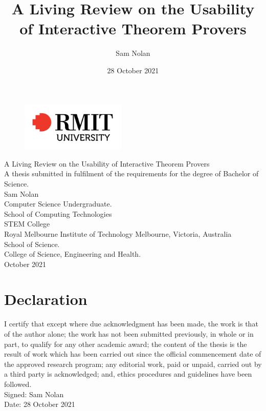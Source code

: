 \documentclass[
]{article}
\title{A Living Review on the Usability of Interactive Theorem Provers}
\author{Sam Nolan}
\date{28 October 2021}
\begin{document}
\begin{titlepage}
\begin{figure}[t!]
\centering
\includegraphics[width=5cm]{Images/rmit-logo.png}
\end{figure}


\vspace*{2cm}

\begin{center}
{\large
  A Living Review on the Usability of Interactive Theorem Provers\\
	[1cm]
	A thesis submitted in fulfilment of the requirements for the degree of Bachelor of Science.\\
	[2cm]
	Sam Nolan\\
	[0.5cm]
	Computer Science Undergraduate.\\
	[3cm]
  School of Computing Technologies\\
	[0.5cm]
	STEM College\\
	Royal Melbourne Institute of Technology
	Melbourne, Victoria, Australia\\
	School of Science.\\
	College of Science, Engineering and Health.\\
	[2cm]
  October 2021\\
}
\end{center}
	
\end{titlepage}

\section*{Declaration}
I certify that except where due acknowledgment has been made, the work
is that of the author alone; the work has not been submitted previously,
in whole or in part, to qualify for any other academic award; the
content of the thesis is the result of work which has been carried out
since the official commencement date of the approved research program;
any editorial work, paid or unpaid, carried out by a third party is
acknowledged; and, ethics procedures and guidelines have been
followed.\\
[1cm]
Signed: Sam Nolan\\
[1cm]
Date: 28 October 2021\\
\end{document}

